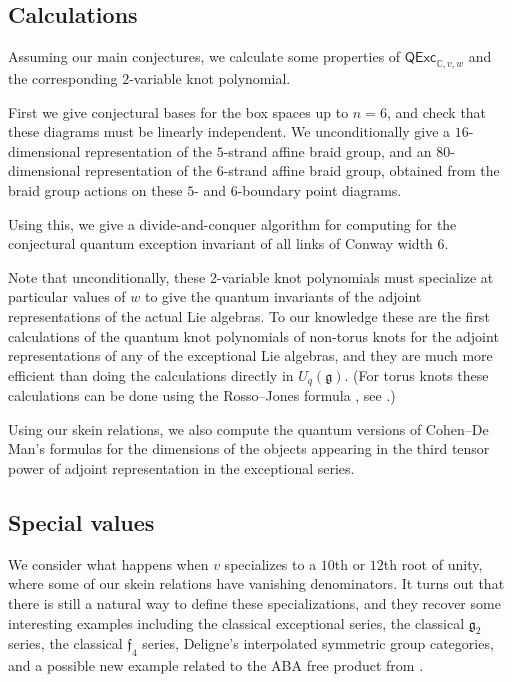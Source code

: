 \documentclass[12pt]{amsart}
\begin{document}
\subsection{Calculations}
Assuming our main conjectures, we calculate some properties of
$\mathsf{QExc}_{\mathbb{C},v,w}$ and the corresponding $2$-variable knot
polynomial.

First we give conjectural bases for the box spaces up to $n=6$, and check that
these diagrams must be linearly independent.  We unconditionally give a
$16$-dimensional representation of the $5$-strand affine braid group, and an
$80$-dimensional representation of the $6$-strand affine braid group, obtained
from the braid group actions on these $5$- and $6$-boundary point diagrams.

Using this, we give a divide-and-conquer algorithm for computing for the
conjectural quantum exception invariant of all links of Conway width 6.

Note that unconditionally, these 2-variable knot polynomials must specialize
at particular values of $w$ to give the quantum invariants of the adjoint
representations of the actual Lie algebras.  To our knowledge these are the
first calculations of the quantum knot polynomials of non-torus knots for the
adjoint representations of any of the exceptional Lie algebras, and they are
much more efficient than doing the calculations directly in $U_q(\mathfrak{g})$.
(For torus knots these calculations can be done using the Rosso--Jones formula
\cite{MR1209320}, see \cite{1510.05884}.)

Using our skein relations, we also compute the quantum versions of Cohen--De
Man's formulas for the dimensions of the objects appearing in the third tensor
power of adjoint representation in the exceptional series.

\subsection{Special values}


We consider what happens when $v$ specializes to a $10$th or $12$th root of
unity, where some of our skein relations have vanishing denominators. It turns
out that there is still a natural way to define these specializations, and
they recover some interesting examples including the classical exceptional
series, the classical $\mathfrak{g}_2$ series, the classical $\mathfrak{f}_4$
series, Deligne's interpolated symmetric group categories, and a possible new
example related to the ABA free product from \cite{MR3624901}.
\end{document}

